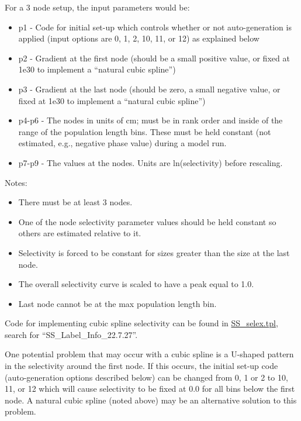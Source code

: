 For a 3 node setup, the input parameters would be:
	\begin{itemize}
		\item p1 - Code for initial set-up which controls whether or not auto-generation is applied (input options are 0, 1, 2, 10, 11, or 12) as explained below
		\item p2 - Gradient at the first node (should be a small positive value, or fixed at 1e30 to implement a ``natural cubic spline'')
		\item p3 - Gradient at the last node (should be zero, a small negative value, or fixed at 1e30 to implement a ``natural cubic spline'')
		\item p4-p6 - The nodes in units of cm; must be in rank order and inside of the range of the population length bins. These must be held constant (not estimated, e.g., negative phase value) during a model run.
		\item p7-p9 - The values at the nodes. Units are ln(selectivity) before rescaling.
	\end{itemize}

Notes:
	\begin{itemize}
		\item There must be at least 3 nodes.
		\item One of the node selectivity parameter values should be held constant so others are estimated relative to it.
		\item Selectivity is forced to be constant for sizes greater than the size at the last node.
		\item The overall selectivity curve is scaled to have a peak equal to 1.0.
		\item Last node cannot be at the max population length bin.
	\end{itemize}
	
Code for implementing cubic spline selectivity can be found in
\href{https://github.com/nmfs-ost/ss3-source-code/blob/main/SS_selex.tpl}{SS\_selex.tpl},
search for ``SS\_Label\_Info\_22.7.27''.

One potential problem that may occur with a cubic spline is a U-shaped pattern in the selectivity around the first node. If this occurs, the initial set-up code (auto-generation options described below) can be changed from 0, 1 or 2 to 10, 11, or 12 which will cause selectivity to be fixed at 0.0 for all bins below the first node. A natural cubic spline (noted above) may be an alternative solution to this problem.


